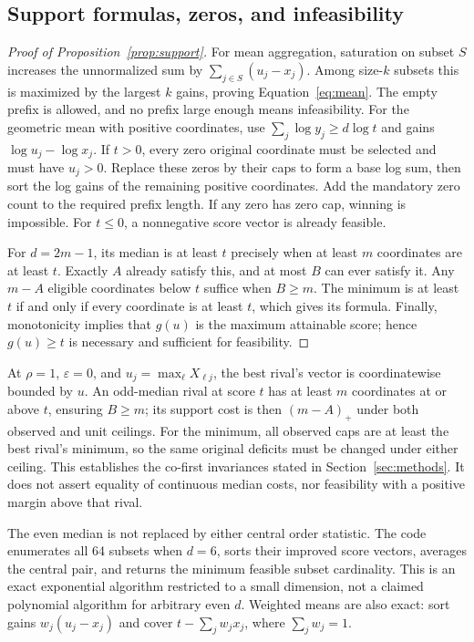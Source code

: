 \documentclass{article}
\newcommand{\eps}{\varepsilon}
\begin{document}
\subsection{Support formulas, zeros, and infeasibility}
\begin{proof}[Proof of Proposition~\ref{prop:support}]
For mean aggregation, saturation on subset $S$ increases the unnormalized sum by
$\sum_{j\in S}(u_j-x_j)$. Among size-$k$ subsets this is maximized by the largest
$k$ gains, proving Equation~\ref{eq:mean}. The empty prefix is allowed, and no
prefix large enough means infeasibility. For the geometric mean with positive
coordinates, use $\sum_j\log y_j\ge d\log t$ and gains
$\log u_j-\log x_j$. If $t>0$, every zero original coordinate must be selected
and must have $u_j>0$. Replace these zeros by their caps to form a base log sum,
then sort the log gains of the remaining positive coordinates. Add the mandatory
zero count to the required prefix length. If any zero has zero cap, winning is
impossible. For $t\le0$, a nonnegative score vector is already feasible.

For $d=2m-1$, its median is at least $t$ precisely when at least $m$ coordinates
are at least $t$. Exactly $A$ already satisfy this, and at most $B$ can ever
satisfy it. Any $m-A$ eligible coordinates below $t$ suffice when $B\ge m$.
The minimum is at least $t$ if and only if every coordinate is at least $t$,
which gives its formula. Finally, monotonicity implies that $g(u)$ is the maximum
attainable score; hence $g(u)\ge t$ is necessary and sufficient for feasibility.
\end{proof}

At $\rho=1$, $\eps=0$, and $u_j=\max_\ell X_{\ell j}$, the best rival's vector
is coordinatewise bounded by $u$. An odd-median rival at score $t$ has at least
$m$ coordinates at or above $t$, ensuring $B\ge m$; its support cost is then
$(m-A)_+$ under both observed and unit ceilings. For the minimum, all observed
caps are at least the best rival's minimum, so the same original deficits must
be changed under either ceiling. This establishes the co-first invariances
stated in Section~\ref{sec:methods}. It does not assert equality of continuous
median costs, nor feasibility with a positive margin above that rival.

The even median is not replaced by either central order statistic. The code
enumerates all 64 subsets when $d=6$, sorts their improved score vectors, averages
the central pair, and returns the minimum feasible subset cardinality. This is an
exact exponential algorithm restricted to a small dimension, not a claimed
polynomial algorithm for arbitrary even $d$. Weighted means are also exact:
sort gains $w_j(u_j-x_j)$ and cover $t-\sum_jw_jx_j$, where $\sum_jw_j=1$.
\end{document}
